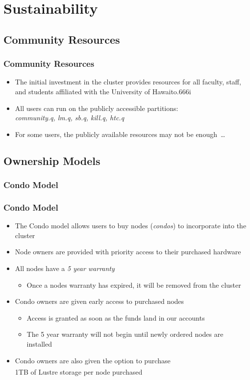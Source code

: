 \documentclass[t,hyperref={pdfpagelabels=false}]{beamer}
\newlength{\okinalen}
\newcommand{\okina}{\hbox to.666\okinalen{\hss`\hss}}
\newcommand{\regtrademark}{\fontsize{5}{6}\selectfont \textsuperscript{\textregistered}}
\newcommand{\hawaii}{Hawai{\okina}i}
\newcommand{\lustre}{Lustre{\regtrademark}}
\begin{document}
\section{Sustainability}
\subsection{Community Resources}
\begin{frame}
	\frametitle{Community Resources}
	\begin{itemize}
		\item The initial investment in the cluster provides resources for all faculty, staff, and students affiliated with the University of {\hawaii}
		\item All users can run on the publicly accessible partitions:\\ \emph{community.q, lm.q, sb.q, kill.q, htc.q}
		\item For some users, the publicly available resources may not be enough~\ldots
	\end{itemize}
\end{frame}

\subsection{Ownership Models}

\subsubsection{Condo Model}
\begin{frame}
	\frametitle{Condo Model}
	\begin{itemize}
		\item The Condo model allows users to buy nodes (\emph{condos}) to incorporate into the cluster	
		\item Node owners are provided with priority access to their purchased hardware
		\item All nodes have a \emph{5 year warranty}
		\begin{itemize}
			\item Once a nodes warranty has expired, it will be removed from the cluster
		\end{itemize}
		\item Condo owners are given early access to purchased nodes
		  \begin{itemize}
                    \item Access is granted as soon as the funds land in our accounts
		    \item The 5 year warranty will not begin until newly ordered nodes are installed
		\end{itemize}
		\item Condo owners are also given the option to purchase~\\1TB of {\lustre} storage per node purchased
	\end{itemize}
\end{frame}
\end{document}
